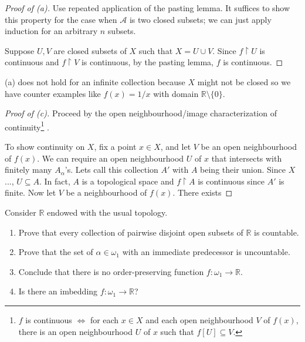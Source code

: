 \documentclass[../../main.tex]{subfiles}
\begin{document}
\begin{proof}[Proof of (a)]
	Use repeated application of the pasting lemma.
    It suffices to show this property for the case when $\mathscr{A}$ is two closed subsets; we can just apply induction for an arbitrary $n$ subsets.

    Suppose $U, V$ are closed subsets of $X$ such that $X = U \cup V$.
    Since $f \upharpoonright U$ is continuous and $f \upharpoonright V$ is continuous, by the pasting lemma, $f$ is continuous.
\end{proof}

(a) does not hold for an infinite collection because $X$ might not be closed so we have counter examples like $f(x) = 1/x$ with domain $\mathbb{R} \setminus \{0\}$.

\begin{proof}[Proof of (c)]
	Proceed by the open neighbourhood/image characterization of continuity\footnote{$f$ is continuous $\Leftrightarrow$ for each $x \in X$ and each open neighbourhood $V$ of $f(x)$, there is an open neighbourhood $U$ of $x$ such that $f[U] \subseteq V$.}
	.



	To show continuity on $X$, fix a point $x \in X$, and let $V$ be an open neighbourhood of $f(x)$.
	We can require an open neighbourhood $U$ of $x$ that intersects with finitely many $A_\alpha$'s.
    Lets call this collection $A'$ with $A$ being their union.
    Since $X$..., $U \subseteq A$.
    In fact, $A$ is a topological space and $f \upharpoonright A$ is continuous since $A'$ is finite.
    Now let $V$ be a neighbourhood of $f(x)$.
    There exists 
\end{proof}

\begin{problem}[5]
Consider $\mathbb{R}$ endowed with the usual topology.
\begin{enumerate}[label=(\alph*)]
	\item Prove that every collection of pairwise disjoint open subsets of $\mathbb{R}$ is countable.
	\item Prove that the set of $\alpha\in\omega_1$ with an immediate predecessor is uncountable.
	\item Conclude that there is no order-preserving function $f\colon\omega_1\to\mathbb{R}$.
	\item Is there an imbedding $f\colon\omega_1\to\mathbb{R}$?
\end{enumerate}
\end{problem}
\end{document}
